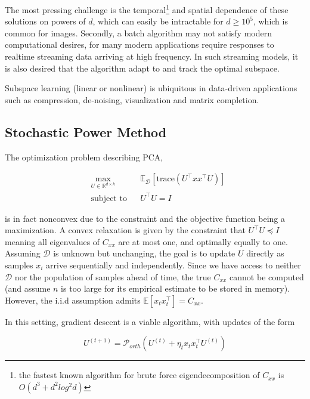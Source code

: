 \documentclass[11pt,letterpaper]{article}
\begin{document}
The most pressing challenge is the temporal\footnote{the fastest known algorithm for brute force eigendecomposition of $C_{xx}$ is $O(d^3+d^2log^2d)$} and spatial dependence of these solutions on powers of $d$, which can easily be intractable for $d \geq10^5$, which is common for images. Secondly, a batch algorithm may not satisfy modern computational desires, for many modern applications require responses to realtime streaming data arriving at high frequency. In such streaming models, it is also desired that the algorithm adapt to and track the optimal subspace.

Subspace learning (linear or nonlinear) is ubiquitous in data-driven applications such as compression, de-noising, visualization and matrix completion. 



\subsection{Stochastic Power Method}

The optimization problem describing PCA,  

\begin{equation}
\begin{aligned}
& \underset{U \in \mathbb{R}^{d \times k}}{\text{max}}
& & \mathbb{E}_{\mathcal{D}}\left[\text{trace}\left(U^{\top}xx^{\top}U\right)\right] \\
& \text{subject to}
& & U^{\top}U = I
\end{aligned}
\end{equation}

is in fact nonconvex due to the constraint and the objective function being a maximization. A convex relaxation is given by the constraint that $U^{\top}U \preceq I$ meaning all eigenvalues of $C_{xx}$ are at most one, and optimally equally to one. Assuming $\mathcal{D}$ is unknown but unchanging, the goal is to update $U$ directly as samples $x_i$ arrive sequentially and independently. Since we have access to neither $\mathcal{D}$ nor the population of samples ahead of time, the true $C_{xx}$ cannot be computed (and assume $n$ is too large for its empirical estimate to be stored in memory). However, the i.i.d assumption admits $\mathbb{E}[ x_t x_t^{\top}] = C_{xx}$.

In this setting, gradient descent is a viable algorithm, with updates of the form 

\begin{equation}
U^{(t + 1)} = \mathcal{P}_{orth} \left( U^{(t)} + \eta_t x_t x_t^{\top}U^{(t)} \right)
\end{equation}
\end{document}
